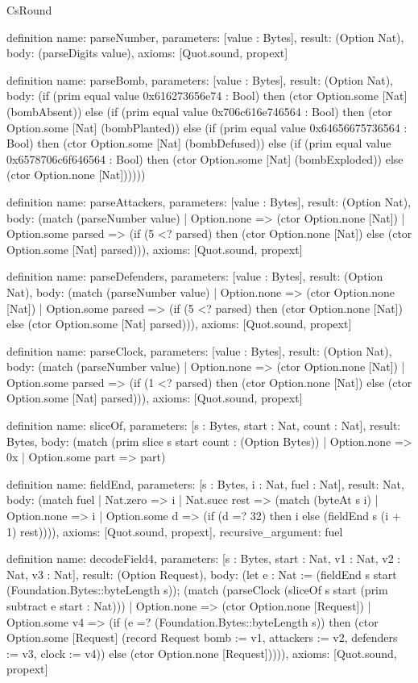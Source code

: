 \begin{lexlean}{CsRound}
\begin{semanticmodule}
definition{
  name: parseNumber,
  parameters: [value : Bytes],
  result: (Option Nat),
  body: (parseDigits value),
  axioms: [Quot.sound, propext]
}

definition{
  name: parseBomb,
  parameters: [value : Bytes],
  result: (Option Nat),
  body: (if (prim equal value 0x616273656e74 : Bool) then (ctor Option.some [Nat] (bombAbsent)) else (if (prim equal value 0x706c616e746564 : Bool) then (ctor Option.some [Nat] (bombPlanted)) else (if (prim equal value 0x64656675736564 : Bool) then (ctor Option.some [Nat] (bombDefused)) else (if (prim equal value 0x6578706c6f646564 : Bool) then (ctor Option.some [Nat] (bombExploded)) else (ctor Option.none [Nat])))))
}

definition{
  name: parseAttackers,
  parameters: [value : Bytes],
  result: (Option Nat),
  body: (match (parseNumber value)
    | Option.none => (ctor Option.none [Nat])
    | Option.some parsed => (if (5 <? parsed) then (ctor Option.none [Nat]) else (ctor Option.some [Nat] parsed))),
  axioms: [Quot.sound, propext]
}

definition{
  name: parseDefenders,
  parameters: [value : Bytes],
  result: (Option Nat),
  body: (match (parseNumber value)
    | Option.none => (ctor Option.none [Nat])
    | Option.some parsed => (if (5 <? parsed) then (ctor Option.none [Nat]) else (ctor Option.some [Nat] parsed))),
  axioms: [Quot.sound, propext]
}

definition{
  name: parseClock,
  parameters: [value : Bytes],
  result: (Option Nat),
  body: (match (parseNumber value)
    | Option.none => (ctor Option.none [Nat])
    | Option.some parsed => (if (1 <? parsed) then (ctor Option.none [Nat]) else (ctor Option.some [Nat] parsed))),
  axioms: [Quot.sound, propext]
}

definition{
  name: sliceOf,
  parameters: [s : Bytes, start : Nat, count : Nat],
  result: Bytes,
  body: (match (prim slice s start count : (Option Bytes))
    | Option.none => 0x
    | Option.some part => part)
}

definition{
  name: fieldEnd,
  parameters: [s : Bytes, i : Nat, fuel : Nat],
  result: Nat,
  body: (match fuel
    | Nat.zero => i
    | Nat.succ rest => (match (byteAt s i)
      | Option.none => i
      | Option.some d => (if (d =? 32) then i else (fieldEnd s (i + 1) rest)))),
  axioms: [Quot.sound, propext],
  recursive_argument: fuel
}

definition{
  name: decodeField4,
  parameters: [s : Bytes, start : Nat, v1 : Nat, v2 : Nat, v3 : Nat],
  result: (Option Request),
  body: (let e : Nat := (fieldEnd s start (Foundation.Bytes::byteLength s)); (match (parseClock (sliceOf s start (prim subtract e start : Nat)))
    | Option.none => (ctor Option.none [Request])
    | Option.some v4 => (if (e =? (Foundation.Bytes::byteLength s)) then (ctor Option.some [Request] (record Request {bomb := v1, attackers := v2, defenders := v3, clock := v4})) else (ctor Option.none [Request])))),
  axioms: [Quot.sound, propext]
}


\end{semanticmodule}
\end{lexlean}
